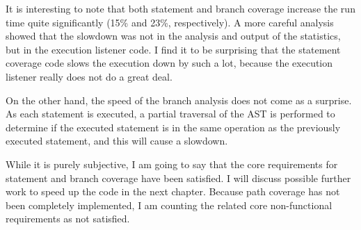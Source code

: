 It is interesting to note that both statement and branch coverage increase the run time quite significantly (15\% and 23\%, respectively). A more careful analysis showed that the slowdown was not in the analysis and output of the statistics, but in the execution listener code. I find it to be surprising that the statement coverage code slows the execution down by such a lot, because the execution listener really does not do a great deal.

On the other hand, the speed of the branch analysis does not come as a surprise. As each statement is executed, a partial traversal of the AST is performed to determine if the executed statement is in the same operation as the previously executed statement, and this will cause a slowdown.

While it is purely subjective, I am going to say that the core requirements for statement and branch coverage have been satisfied. I will discuss possible further work to speed up the code in the next chapter. Because path coverage has not been completely implemented, I am counting the related core non-functional requirements as not satisfied.